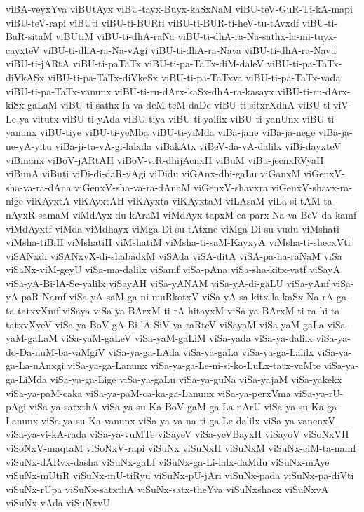 {viBA-veyxYva
viBUtAyx
viBU-tayx-Buyx-kaSxNaM
viBU-teV-GuR-Ti-kA-mapi
viBU-teV-rapi
viBUti
viBU-ti-BURti
viBU-ti-BUR-ti-heV-tu-tAvxdf
viBU-ti-BaR-sitaM
viBUtiM
viBU-ti-dhA-raNa
viBU-ti-dhA-ra-Na-sathx-la-mi-tuyx-cayxteV
viBU-ti-dhA-ra-Na-vAgi
viBU-ti-dhA-ra-Nava
viBU-ti-dhA-ra-Navu
viBU-ti-jARtA
viBU-ti-paTaTx
viBU-ti-pa-TaTx-diM-daleV
viBU-ti-pa-TaTx-diVkASx
viBU-ti-pa-TaTx-diVkeSx
viBU-ti-pa-TaTxva
viBU-ti-pa-TaTx-vada
viBU-ti-pa-TaTx-vanunx
viBU-ti-ru-dArx-kaSx-dhA-ra-kasayx
viBU-ti-ru-dArx-kiSx-gaLaM
viBU-ti-sathx-la-va-deM-teM-daDe
viBU-ti-sitxrXdhA
viBU-ti-viV-Le-ya-vitutx
viBU-ti-yAda
viBU-tiya
viBU-ti-yalilx
viBU-ti-yanUnx
viBU-ti-yanunx
viBU-tiye
viBU-ti-yeMba
viBU-ti-yiMda
viBa-jane
viBa-ja-nege
viBa-ja-ne-yA-yitu
viBa-ji-ta-vA-gi-lalxda
viBakAtx
viBeV-da-vA-dalilx
viBi-dayxteV
viBinanx
viBoV-jARtAH
viBoV-viR-dhijAcnxH
viBuM
viBu-jecnxRVyaH
viBunA
viButi
viDi-di-daR-vAgi
viDidu
viGAnx-dhi-gaLu
viGanxM
viGenxV-sha-va-ra-dAna
viGenxV-sha-va-ra-dAnaM
viGenxV-shavxra
viGenxV-shavx-ra-nige
viKAyxtA
viKAyxtAH
viKAyxta
viKAyxtaM
viLAsaM
viLa-si-tAM-ta-nAyxR-samaM
viMdAyx-du-kAraM
viMdAyx-tapxM-ca-parx-Na-va-BeV-da-kamf
viMdAyxtf
viMda
viMdhayx
viMga-Di-su-tAtxne
viMga-Di-su-vudu
viMshati
viMsha-tiBiH
viMshatiH
viMshatiM
viMsha-ti-saM-KayxyA
viMsha-ti-shecxVti
viSANxdi
viSANxvX-di-shabadxM
viSAda
viSA-ditA
viSA-pa-ha-raNaM
viSa
viSaNx-viM-geyU
viSa-ma-dalilx
viSamf
viSa-pAna
viSa-sha-kitx-vatf
viSayA
viSa-yA-Bi-lA-Se-yalilx
viSayAH
viSa-yANAM
viSa-yA-di-gaLU
viSa-yAnf
viSa-yA-paR-Namf
viSa-yA-saM-ga-ni-muRkotxV
viSa-yA-sa-kitx-la-kaSx-Na-rA-ga-ta-tatxvXmf
viSaya
viSa-ya-BArxM-ti-rA-hitayxM
viSa-ya-BArxM-ti-ra-hi-ta-tatxvXveV
viSa-ya-BoV-gA-Bi-lA-SiV-va-taRteV
viSayaM
viSa-yaM-gaLa
viSa-yaM-gaLaM
viSa-yaM-gaLeV
viSa-yaM-gaLiM
viSa-yada
viSa-ya-dalilx
viSa-ya-do-Da-nuM-ba-vaMgiV
viSa-ya-ga-LAda
viSa-ya-gaLa
viSa-ya-ga-Lalilx
viSa-ya-ga-La-nAnxgi
viSa-ya-ga-Lanunx
viSa-ya-ga-Le-ni-si-ko-LuLx-tatx-vaMte
viSa-ya-ga-LiMda
viSa-ya-ga-Lige
viSa-ya-gaLu
viSa-ya-guNa
viSa-yajaM
viSa-yakekx
viSa-ya-paM-caka
viSa-ya-paM-ca-ka-ga-Lanunx
viSa-ya-perxVma
viSa-ya-rU-pAgi
viSa-ya-satxthA
viSa-ya-su-Ka-BoV-gaM-ga-La-nArU
viSa-ya-su-Ka-ga-Lanunx
viSa-ya-su-Ka-vanunx
viSa-ya-va-na-ti-ga-Le-dalilx
viSa-ya-vanenxV
viSa-ya-vi-kA-rada
viSa-ya-vuMTe
viSayeV
viSa-yeVBayxH
viSayoV
viSoNxVH
viSoNxV-maqtaM
viSoNxV-rapi
viSuNx
viSuNxH
viSuNxM
viSuNx-ciM-ta-namf
viSuNx-dARvx-dasha
viSuNx-gaLf
viSuNx-ga-Li-lalx-daMdu
viSuNx-mAye
viSuNx-mUtiR
viSuNx-mU-tiRyu
viSuNx-pU-jAri
viSuNx-pada
viSuNx-pa-diVti
viSuNx-rUpa
viSuNx-satxthA
viSuNx-satx-theYva
viSuNxshacx
viSuNxvA
viSuNx-vAda
viSuNxvU
}

